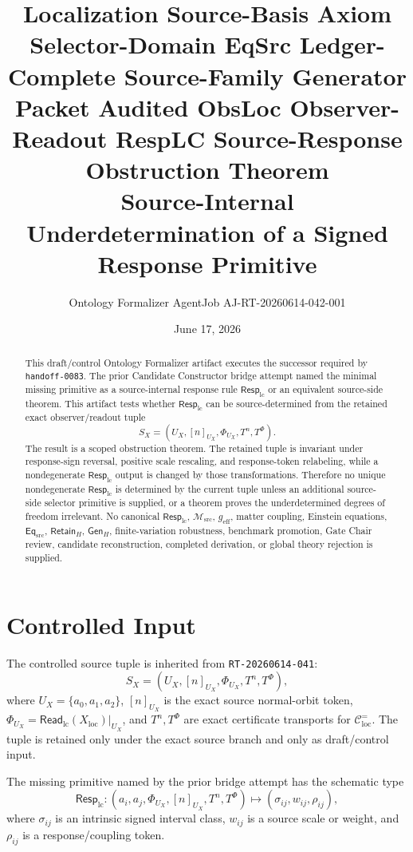 \documentclass[11pt]{article}
\title{\textbf{Localization Source-Basis Axiom Selector-Domain EqSrc Ledger-Complete Source-Family Generator Packet Audited ObsLoc Observer-Readout RespLC Source-Response Obstruction Theorem}\\[0.35em]
\large Source-Internal Underdetermination of a Signed Response Primitive}
\author{Ontology Formalizer AgentJob AJ-RT-20260614-042-001}
\date{June 17, 2026}
\newcommand{\EqSrc}{\mathsf{Eq}_{\mathrm{src}}}
\newcommand{\ReadLC}{\mathsf{Read}_{\mathrm{lc}}}
\newcommand{\RetainH}{\mathsf{Retain}_{H}}
\newcommand{\GenH}{\mathsf{Gen}_{H}}
\newcommand{\Msrc}{\mathcal{M}_{\mathrm{src}}}
\newcommand{\RespLC}{\mathsf{Resp}_{\mathrm{lc}}}
\newcommand{\geff}{g_{\mathrm{eff}}}
\begin{document}
\maketitle

\begin{abstract}
This draft/control Ontology Formalizer artifact executes the successor
required by \texttt{handoff-0083}. The prior Candidate Constructor
bridge attempt named the minimal missing primitive as a source-internal
response rule \(\RespLC\) or an equivalent source-side theorem. This
artifact tests whether \(\RespLC\) can be source-determined from the
retained exact observer/readout tuple
\[
    S_X=(U_X,[n]_{U_X},\Phi_{U_X},T^n,T^\Phi).
\]
The result is a scoped obstruction theorem. The retained tuple is
invariant under response-sign reversal, positive scale rescaling, and
response-token relabeling, while a nondegenerate \(\RespLC\) output is
changed by those transformations. Therefore no unique nondegenerate
\(\RespLC\) is determined by the current tuple unless an additional
source-side selector primitive is supplied, or a theorem proves the
underdetermined degrees of freedom irrelevant. No canonical
\(\RespLC\), \(\Msrc\), \(\geff\), matter coupling, Einstein
equations, \(\EqSrc\), \(\RetainH\), \(\GenH\), finite-variation
robustness, benchmark promotion, Gate Chair review, candidate
reconstruction, completed derivation, or global theory rejection is
supplied.
\end{abstract}

\section{Controlled Input}

The controlled source tuple is inherited from
\texttt{RT-20260614-041}:
\[
    S_X=(U_X,[n]_{U_X},\Phi_{U_X},T^n,T^\Phi),
\]
where \(U_X=\{a_0,a_1,a_2\}\),
\([n]_{U_X}\) is the exact source normal-orbit token,
\(\Phi_{U_X}=\ReadLC(X_{\mathrm{loc}})|_{U_X}\), and
\(T^n,T^\Phi\) are exact certificate transports for
\(\mathcal{C}^{=}_{\mathrm{loc}}\). The tuple is retained only under
the exact source branch and only as draft/control input.

The missing primitive named by the prior bridge attempt has the
schematic type
\[
    \RespLC:
    (a_i,a_j,\Phi_{U_X},[n]_{U_X},T^n,T^\Phi)
    \longmapsto
    (\sigma_{ij},w_{ij},\rho_{ij}),
\]
where \(\sigma_{ij}\) is an intrinsic signed interval class,
\(w_{ij}\) is a source scale or weight, and \(\rho_{ij}\) is a
response/coupling token.
\end{document}
